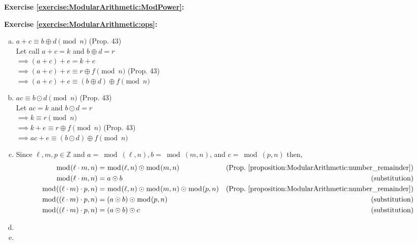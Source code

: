 \noindent\textbf{Exercise \ref{exercise:ModularArithmetic:ModPower}:} 

\noindent\textbf{Exercise \ref{exercise:ModularArithmetic:ops}:} %
\begin{enumerate}[(a)]
\item
$a+c \equiv b \oplus d \pmod{n}$ (Prop. 43)\\
Let call $a+c=k$ and $b \oplus d=r$\\
$\implies (a+c)+e=k+e$\\
$\implies (a+c)+e \equiv r \oplus f \pmod{n}$ (Prop. 43)\\
$\implies (a+c)+e \equiv (b \oplus d) \oplus f \pmod{n}$

\item
$ac \equiv b \odot d \pmod{n}$ (Prop. 43)\\
Let $ac=k$ and $b \odot d =r$\\
$\implies k \equiv r \pmod{n}$\\
$\implies k+e \equiv r \oplus f \pmod{n}$ (Prop. 43)\\
$\implies ac+e \equiv (b \odot d) \oplus f \pmod{n}$

\item
Since $\ell, m, p \in {\mathbb Z}$ and $a = \bmod(\ell,n), b = \bmod(m,n)$, and $c = \bmod(p,n)$ then,
\begin{align*}
\bmod(\ell \cdot m, n) &= \bmod(\ell, n) \odot \bmod(m,n) &\text{(Prop.~\ref{proposition:ModularArithmetic:number_remainder})}\\
\bmod(\ell \cdot m, n) &= a \odot b &\text{(substitution)}\\
\bmod((\ell \cdot m)\cdot p, n) &= \bmod(\ell, n) \odot \bmod(m,n) \odot \bmod(p,n) &\text{(Prop.~\ref{proposition:ModularArithmetic:number_remainder})}\\
\bmod((\ell \cdot m)\cdot p, n) &=  (a \odot b) \odot \bmod(p,n) &\text{(substitution)}\\
\bmod((\ell \cdot m)\cdot p, n) &=  (a \odot b) \odot c &\text{(substitution)}
\end{align*}

\item
\item
\end{enumerate}

